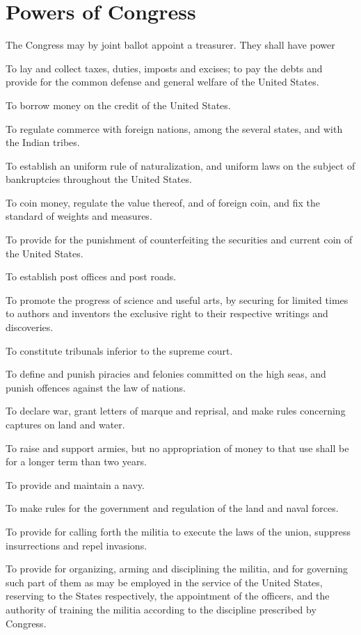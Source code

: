 \documentclass{constitution}
\begin{document}
\section{Powers of Congress}
The Congress may by joint ballot appoint a treasurer.
They shall have power

To lay and collect taxes, duties, imposts and excises;
to pay the debts and provide for the common defense and general welfare of the United States.

To borrow money on the credit of the United States.

To regulate commerce with foreign nations, among the several states, and with the Indian tribes.

To establish an uniform rule of naturalization,
and uniform laws on the subject of bankruptcies throughout the United States.

To coin money, regulate the value thereof, and of foreign coin,
and fix the standard of weights and measures.

To provide for the punishment of counterfeiting the securities and current coin of the United States.

To establish post offices and post roads.

To promote the progress of science and useful arts,
by securing for limited times to authors and inventors the exclusive right to their respective writings and discoveries.

To constitute tribunals inferior to the supreme court.

To define and punish piracies and felonies committed on the high seas,
and punish offences against the law of nations.

To declare war, grant letters of marque and reprisal,
and make rules concerning captures on land and water.

To raise and support armies,
 but no appropriation of money to that use shall be for a longer term than two years.

To provide and maintain a navy.

To make rules for the government and regulation of the land and naval forces.

To provide for calling forth the militia to execute the laws of the union, suppress insurrections and repel invasions.

To provide for organizing, arming and disciplining the militia,
and for governing such part of them as may be employed in the service of the United States,
reserving to the States respectively, the appointment of the officers, and the authority of training the militia according to the discipline prescribed by Congress.
\end{document}
